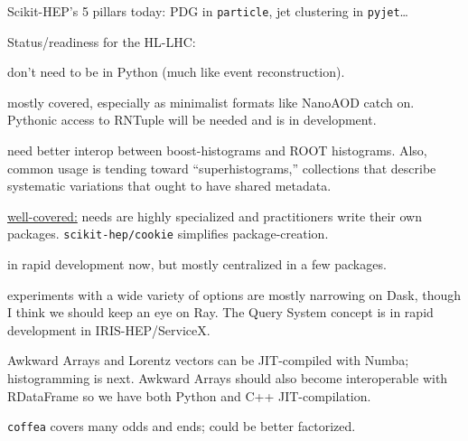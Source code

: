 \documentclass[aspectratio=169]{beamer}
\begin{document}
\begin{frame}{Scikit-HEP's 5 pillars today:}
PDG in \texttt{particle}, jet clustering in \texttt{pyjet}\ldots
\end{frame}

\begin{frame}{Status/readiness for the HL-LHC:}
\vspace{0.2 cm}


\begin{description}[<+-|alert@+>]
\item[\textcolor{darkblue}{Simulations:}] don't need to be in Python (much like event reconstruction).

\item[\textcolor{darkblue}{Datasets:}] mostly covered, especially as minimalist formats like NanoAOD catch on. Pythonic access to RNTuple will be needed and is in development.

\item[\textcolor{darkblue}{Aggregations:}] need better interop between boost-histograms and ROOT histograms. Also, common usage is tending toward ``superhistograms,'' collections that describe systematic variations that ought to have shared metadata.

\item[\textcolor{darkblue}{Modeling/fitting:}] \underline{well-covered:} needs are highly specialized and practitioners write their own packages. \texttt{scikit-hep/cookie} simplifies package-creation.

\item[\textcolor{darkblue}{Visualization:}] in rapid development now, but mostly centralized in a few packages.

\item[\textcolor{darkblue}{Distributed computing:}] experiments with a wide variety of options are mostly narrowing on Dask, though I think we should keep an eye on Ray. The Query System concept is in rapid development in IRIS-HEP/ServiceX.

\item[\textcolor{darkblue}{Acceleration:}] Awkward Arrays and Lorentz vectors can be JIT-compiled with Numba; histogramming is next. Awkward Arrays should also become interoperable with RDataFrame so we have both Python and C++ JIT-compilation.

\item[\textcolor{darkblue}{HEP domain-specific:}] \texttt{coffea} covers many odds and ends; could be better factorized.
\end{description}
\end{frame}
\end{document}

